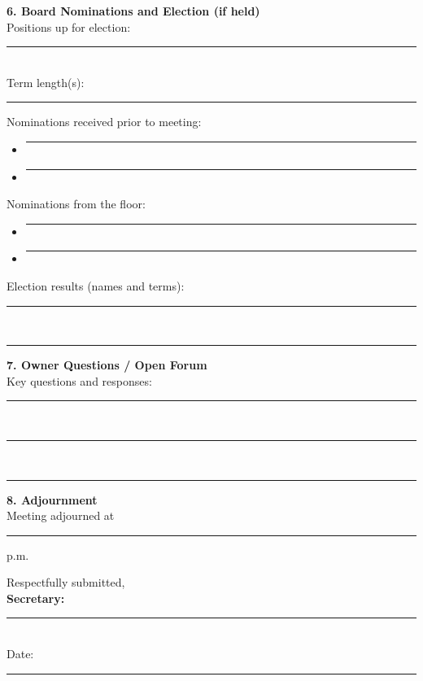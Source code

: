 \documentclass[11pt]{article}
\newcommand{\strong}[1]{\textbf{#1}}
\begin{document}
\noindent
\strong{6. Board Nominations and Election (if held)}\\[0.5em]
Positions up for election: \rule{3in}{0.4pt}\\
Term length(s): \rule{3in}{0.4pt}

\medskip

\noindent
Nominations received prior to meeting:
\begin{itemize}[leftmargin=1.1em]
    \item \rule{3in}{0.4pt}
    \item \rule{3in}{0.4pt}
\end{itemize}

Nominations from the floor:
\begin{itemize}[leftmargin=1.1em]
    \item \rule{3in}{0.4pt}
    \item \rule{3in}{0.4pt}
\end{itemize}

\medskip

\noindent
Election results (names and terms):

\vspace{0.5em}
\rule{6in}{0.4pt}\\[0.5em]
\rule{6in}{0.4pt}

\vspace{1em}

\noindent
\strong{7. Owner Questions / Open Forum}\\[0.5em]
Key questions and responses:

\vspace{0.5em}
\rule{6in}{0.4pt}\\[0.5em]
\rule{6in}{0.4pt}\\[0.5em]
\rule{6in}{0.4pt}

\vspace{1em}

\noindent
\strong{8. Adjournment}\\[0.5em]
Meeting adjourned at \rule{1in}{0.4pt} p.m.

\vspace{1em}

\noindent
Respectfully submitted,\\[1em]
\strong{Secretary:} \rule{3in}{0.4pt}\\[0.5em]
Date: \rule{2in}{0.4pt}

\vfill
\label{LastPage}
\end{document}
